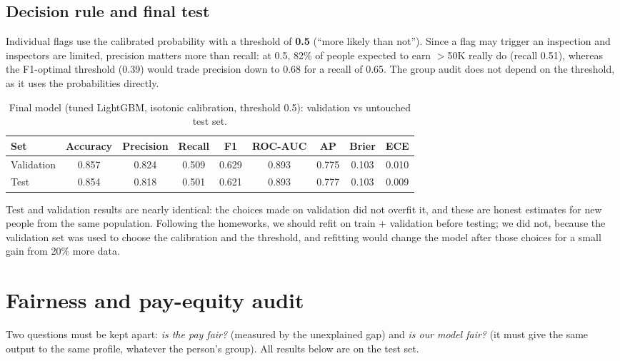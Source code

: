 \documentclass[11pt,a4paper]{article}
\begin{document}
\subsection{Decision rule and final test}

Individual flags use the calibrated probability with a threshold of \textbf{0.5} (``more likely than not''). Since a flag may trigger an inspection and inspectors are limited, precision matters more than recall: at 0.5, 82\% of people expected to earn $>$50K really do (recall 0.51), whereas the F1-optimal threshold (0.39) would trade precision down to 0.68 for a recall of 0.65. The group audit does not depend on the threshold, as it uses the probabilities directly.

\begin{table}[H]
\centering\small
\caption{Final model (tuned LightGBM, isotonic calibration, threshold 0.5): validation vs untouched test set.}
\label{tab:test}
\begin{tabular}{lcccccccc}
\toprule
\rowcolor{headblue}
Set & Accuracy & Precision & Recall & F1 & ROC-AUC & AP & Brier & ECE \\
\midrule
Validation & 0.857 & 0.824 & 0.509 & 0.629 & 0.893 & 0.775 & 0.103 & 0.010 \\
Test & 0.854 & 0.818 & 0.501 & 0.621 & 0.893 & 0.777 & 0.103 & 0.009 \\
\bottomrule
\end{tabular}
\end{table}

\noindent Test and validation results are nearly identical: the choices made on validation did not overfit it, and these are honest estimates for new people from the same population. Following the homeworks, we should refit on train + validation before testing; we did not, because the validation set was used to choose the calibration and the threshold, and refitting would change the model after those choices for a small gain from 20\% more data.

\section{Fairness and pay-equity audit}

Two questions must be kept apart: \emph{is the pay fair?} (measured by the unexplained gap) and \emph{is our model fair?} (it must give the same output to the same profile, whatever the person's group). All results below are on the test set.
\end{document}

